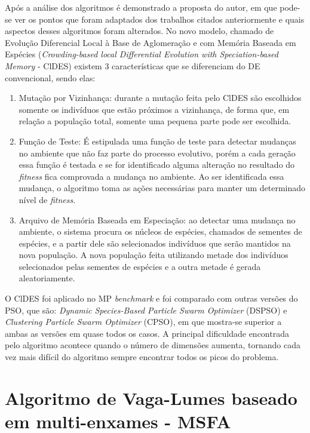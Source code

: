 Após a análise dos algoritmos é demonstrado a proposta do autor, em que pode-se ver os pontos que foram adaptados dos trabalhos citados anteriormente e quais aspectos desses algoritmos foram alterados. No novo modelo, chamado de Evolução Diferencial Local à Base de Aglomeração e com Memória Baseada em Espécies (\textit{Crowding-based local Differential Evolution with Speciation-based Memory} - ClDES) existem 3 características que se diferenciam do DE convencional, sendo elas:

\begin{enumerate}
\item Mutação por Vizinhança: durante a mutação feita pelo ClDES são escolhidos somente os indivíduos que estão próximos a vizinhança, de forma que, em relação a população total, somente uma pequena parte pode ser escolhida.

\item Função de Teste: É estipulada uma função de teste para detectar mudanças no ambiente que não faz parte do processo evolutivo, porém a cada geração essa função é testada e se for identificado alguma alteração no resultado do \textit{fitness} fica comprovada a mudança no ambiente. Ao ser identificada essa mudança, o algoritmo toma as ações necessárias para manter um determinado nível de \textit{fitness}.

\item Arquivo de Memória Baseada em Especiação: ao detectar uma mudança no ambiente, o sistema procura os núcleos de espécies, chamados de sementes de espécies, e a partir dele são selecionados indivíduos que serão mantidos na nova população. A nova população feita utilizando metade dos indivíduos selecionados pelas sementes de espécies e a outra metade é gerada aleatoriamente.
\end{enumerate}

O ClDES foi aplicado no MP \textit{benchmark} e foi comparado com outras versões do PSO, que são: \textit{Dynamic Species-Based Particle Swarm Optimizer} (DSPSO) e \textit{Clustering Particle Swarm Optimizer} (CPSO), em que mostra-se superior a ambas as versões em quase todos os casos. A principal dificuldade encontrada pelo algoritmo acontece quando o número de dimensões aumenta, tornando cada vez mais difícil do algoritmo sempre encontrar todos os picos do problema.

\section{Algoritmo de Vaga-Lumes baseado em multi-enxames - MSFA}
\label{sec:fa_behaviour}

